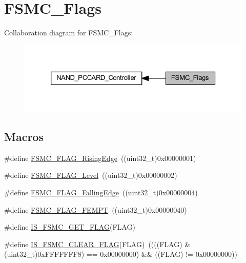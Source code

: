 \hypertarget{group___f_s_m_c___flags}{}\section{F\+S\+M\+C\+\_\+\+Flags}
\label{group___f_s_m_c___flags}
Collaboration diagram for F\+S\+M\+C\+\_\+\+Flags\+:
\nopagebreak
\begin{figure}[H]
\begin{center}
\leavevmode
\includegraphics[width=326pt]{group___f_s_m_c___flags}
\end{center}
\end{figure}
\subsection*{Macros}
\begin{DoxyCompactItemize}
\item 
\#define \hyperlink{group___f_s_m_c___flags_ga5aadbd5d9f1b6a25bcc1fc6f3bf4c9cc}{F\+S\+M\+C\+\_\+\+F\+L\+A\+G\+\_\+\+Rising\+Edge}~((uint32\+\_\+t)0x00000001)
\item 
\#define \hyperlink{group___f_s_m_c___flags_ga25868d35780998a52190c424ebb3823f}{F\+S\+M\+C\+\_\+\+F\+L\+A\+G\+\_\+\+Level}~((uint32\+\_\+t)0x00000002)
\item 
\#define \hyperlink{group___f_s_m_c___flags_gaaaa85bce06ed962874686ad7af0f0cb7}{F\+S\+M\+C\+\_\+\+F\+L\+A\+G\+\_\+\+Falling\+Edge}~((uint32\+\_\+t)0x00000004)
\item 
\#define \hyperlink{group___f_s_m_c___flags_ga8da2bd0b9d11877aaebaba0c77e8b0cc}{F\+S\+M\+C\+\_\+\+F\+L\+A\+G\+\_\+\+F\+E\+M\+PT}~((uint32\+\_\+t)0x00000040)
\item 
\#define \hyperlink{group___f_s_m_c___flags_gab8674160ef7884f939e07041bbf5b18b}{I\+S\+\_\+\+F\+S\+M\+C\+\_\+\+G\+E\+T\+\_\+\+F\+L\+AG}(F\+L\+AG)
\item 
\#define \hyperlink{group___f_s_m_c___flags_ga1114bf56b54e726831b38fc8c5daa14e}{I\+S\+\_\+\+F\+S\+M\+C\+\_\+\+C\+L\+E\+A\+R\+\_\+\+F\+L\+AG}(F\+L\+AG)~((((F\+L\+AG) \& (uint32\+\_\+t)0x\+F\+F\+F\+F\+F\+F\+F8) == 0x00000000) \&\& ((\+F\+L\+A\+G) != 0x00000000))
\end{DoxyCompactItemize}


